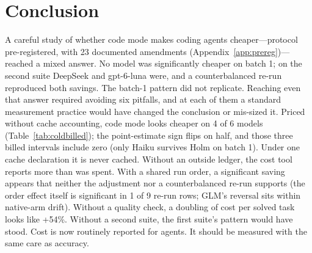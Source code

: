 \documentclass[10pt]{article}
\begin{document}
\section{Conclusion}\label{sec:conclusion}

A careful study of whether code mode makes coding agents cheaper---protocol pre-registered, with 23
documented amendments (Appendix~\ref{app:prereg})---reached a mixed
answer. No model was significantly cheaper on batch 1; on the second suite DeepSeek and gpt-6-luna were, and a counterbalanced re-run reproduced both savings. The batch-1 pattern did not replicate. Reaching
even that answer required avoiding six pitfalls, and at each of them a standard measurement practice
would have changed the conclusion or mis-sized it. Priced without cache accounting, code mode looks cheaper on 4 of 6
models (Table~\ref{tab:coldbilled}); the point-estimate sign flips on half, and those three billed intervals include zero (only Haiku survives Holm on batch 1). Under one cache declaration it is never cached. Without an outside ledger, the cost tool
reports more than was spent. With a shared run order, a significant saving appears that neither the
adjustment nor a counterbalanced re-run supports (the order effect itself is significant in 1 of 9 re-run rows; GLM's reversal sits within native-arm drift).
Without a quality check, a doubling of cost per solved task looks like +54\%. Without a second suite,
the first suite's pattern would have stood. Cost is now routinely reported for agents. It should be
measured with the same care as accuracy.



\end{document}
